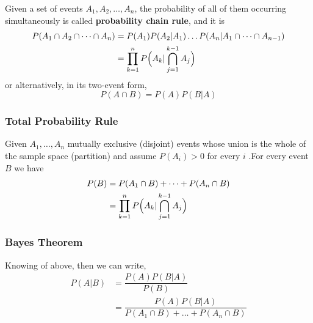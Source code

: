 Given a set of events $A_1, A_2, \dots, A_n$, the probability of all of them
occurring simultaneously is called \textbf{probability chain rule}, and it is
\begin{equation*}
    \begin{split}
        P(A_1\cap A_2 \cap \dots \cap A_n) &= P(A_1)P(A_2|A_1)\dots P(A_n|A_1\cap \dots \cap A_{n-1})\\
                                           &= \prod_{k=1}^{n}P\Bigl(A_k|\bigcap_{j=1}^{k-1}A_j\Bigr)
    \end{split}
\end{equation*} 
or alternatively, in its two-event form,
\begin{equation*}
    P(A \cap B) = P(A)P(B|A)
\end{equation*}

\subsubsection{Total Probability Rule} %
\label{ssub:total_probability_rule}

Given $A_1,\dots,A_n$ mutually exclusive (disjoint) events whose union is the
whole of the sample space (partition) and assume $P(A_i) > 0$ for every $i$ .For
every event $B$ we have
\begin{equation*}
    \begin{split}
        P(B) &= P(A_1\cap B) + \dots + P(A_n \cap B)\\
             &= \prod_{k=1}^{n}P\Bigl(A_k|\bigcap_{j=1}^{k-1}A_j\Bigr)
    \end{split}
\end{equation*}

\subsubsection{Bayes Theorem} %
\label{ssub:bayes_theorem}

Knowing of above, then we can write,
\begin{equation*}
    \begin{split}
        P(A|B) &= \dfrac{P(A)P(B|A)}{P(B)}\\
               &= \dfrac{P(A)P(B|A)}{P(A_1\cap B) + \dots + P(A_n \cap B)}
    \end{split}
\end{equation*}

